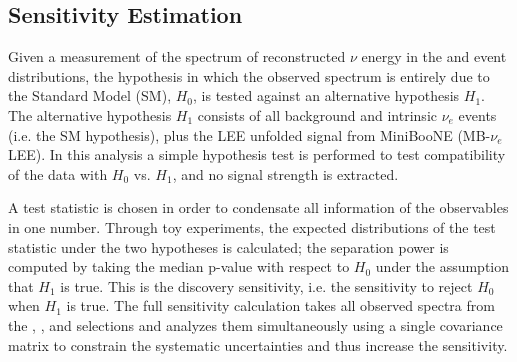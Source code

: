 \subsection{Sensitivity Estimation}
Given a measurement of the spectrum of reconstructed $\nu$ energy in the \npsel and \zpsel event distributions, the hypothesis in which the observed spectrum is entirely due to the Standard Model (SM), $H_0$, is tested against an alternative hypothesis $H_1$.
The alternative hypothesis $H_1$ consists of all background and intrinsic $\nu_e$ events (i.e. the SM hypothesis), plus the LEE unfolded signal from MiniBooNE (MB-$\nu_e$ LEE).
In this analysis a simple hypothesis test is performed to test compatibility of the data with $H_0$ vs. $H_1$, and no signal strength is extracted.

A test statistic is chosen in order to condensate all information of the observables in one number.
Through toy experiments, the expected distributions of the test statistic under the two hypotheses is calculated; the separation power is computed by taking the median p-value with respect to $H_0$ under the assumption that $H_1$ is true. This is the discovery sensitivity, i.e. the sensitivity to reject $H_0$ when $H_1$ is true.
The full sensitivity calculation takes all observed spectra from the \npsel, \zpsel, and \numu selections and analyzes them simultaneously using a single covariance matrix to constrain the systematic uncertainties and thus increase the sensitivity.

